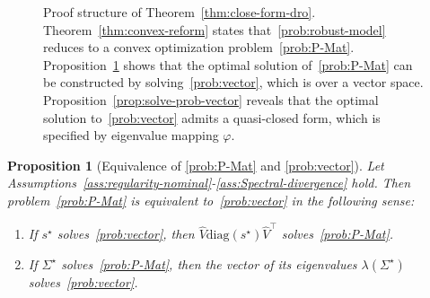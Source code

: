 \documentclass[11pt]{article}
\newtheorem{proposition}{Proposition}
\newcommand{\opt}{^\star}
\def\diag{\mathrm{diag}}
\def\transpose{\top}
\newcommand{\wh}{\widehat}
\begin{document}
\begin{figure}[ht]
\centering
{}
\caption{Proof structure of Theorem~\ref{thm:close-form-dro}. Theorem~\ref{thm:convex-reform} states that~\eqref{prob:robust-model} reduces to a convex optimization problem~\eqref{prob:P-Mat}. Proposition~\ref{prop:equivalence-Mat-Vec} shows that the optimal solution of~\eqref{prob:P-Mat} can be constructed by solving~\eqref{prob:vector}, which is over a vector space. Proposition~\ref{prop:solve-prob-vector} reveals that the optimal solution to~\eqref{prob:vector} admits a quasi-closed form, which is specified by eigenvalue mapping $\varphi$.}
\label{fig:proof-thm2}
\end{figure}


\begin{proposition}[Equivalence of \eqref{prob:P-Mat} and \eqref{prob:vector}]\label{prop:equivalence-Mat-Vec}
    Let Assumptions~\ref{ass:regularity-nominal}-\ref{ass:Spectral-divergence} hold. Then problem~\eqref{prob:P-Mat} is equivalent to~\eqref{prob:vector} in the following sense:
    \begin{enumerate}[label=(\roman*)]
        \item\label{prop:equivalence-Mat-Vec-1} If $s\opt$ solves~\eqref{prob:vector}, then $\widehat{V}\diag(s\opt)\widehat{V}^\transpose$ solves~\eqref{prob:P-Mat}.
        \item\label{prop:equivalence-Mat-Vec-2} If $\Sigma\opt$ solves~\eqref{prob:P-Mat}, then the vector of its eigenvalues $\lambda(\Sigma\opt)$ solves~\eqref{prob:vector}.
    \end{enumerate}
\end{proposition}
\end{document}

